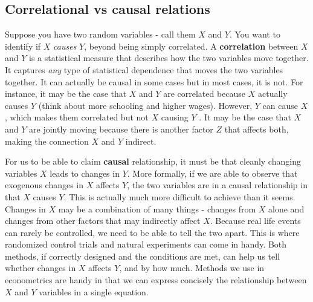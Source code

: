 \documentclass[12pt]{article}
\theoremstyle{definition}
\theoremstyle{property}
\theoremstyle{assumption}
\theoremstyle{example}
\theoremstyle{comment}
\begin{document}
\subsection{Correlational vs causal relations}
Suppose you have two random variables - call them $X$ and $Y$. You want to identify if $X$ \textit{causes} $Y$, beyond being simply correlated. A \textbf{correlation} between $X$ and $Y$ is a statistical measure that describes how the two variables move together. It captures \textit{any} type of statistical dependence that moves the two variables together. It can actually be causal in some cases but in most cases, it is not. For instance, it may be the case that $X$ and $Y$ are correlated because $X$ actually causes $Y$ (think about more schooling and higher wages). However, $Y$ can cause $X$, which makes them correlated but not $X$ causing $Y$ . It may be the case that $X$ and $Y$ are jointly moving because there is another factor $Z$ that affects both, making the connection $X$ and $Y$ indirect. \par
For us to be able to claim \textbf{causal} relationship, it must be that cleanly changing variables $X$ leads to changes in $Y$. More formally, if we are able to observe that exogenous changes in $X$ affects $Y$, the two variables are in a causal relationship in that $X$ causes $Y$. This is actually much more difficult to achieve than it seems. Changes in $X$ may be a combination of many things - changes from $X$ alone and changes from other factors that may indirectly affect $X$. Because real life events can rarely be controlled, we need to be able to tell the two apart. This is where randomized control trials and natural experiments can come in handy. Both methods, if correctly designed and the conditions are met, can help us tell whether changes in $X$ affects $Y$, and by how much. Methods we use in econometrics are handy in that we can express concisely the relationship between $X$ and $Y$ variables in a single equation. 
\end{document}
